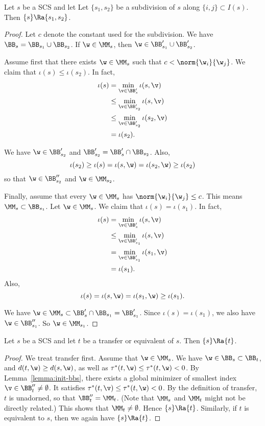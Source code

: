 \begin{lemma}[subdivision]
Let $s$ be a SCS and let
Let $\{s_1,s_2\}$ be a subdivision of $s$ along $\{i,j\}\subset I(s)$.
Then $\{s\}\Ra\{s_1,s_2\}$.
\end{lemma}

\begin{proof}
Let $c$ denote the constant used for the subdivision.
We have $\BB_s =
\BB_{s_1}\cup \BB_{s_2}$.  If $\w\in \MM_s$, then
$\w\in \BB'_{s_1}\cup\BB'_{s_2}$.

Assume first that there exists $\w\in \MM_s$ such that $c < \norm{\w_i}{\w_j}$.
We claim that $\iota(s) \le \iota(s_2)$.  In fact,
\begin{align*}
\iota(s) &=\min_{\v\in \BB'_s} \iota(s,\v)\\
&\le \min_{\v\in \BB'_{s_2}} \iota(s,\v) \\
&\le \min_{\v\in \BB'_{s_2}} \iota(s_2,\v) \\
&=\iota(s_2).
\end{align*}

We have $\w\in\BB'_{s_2}$ and $\BB'_{s_2} = \BB'_s \cap \BB_{s_2}$.
Also,
\[
\iota(s_2)\ge \iota(s) = \iota(s,\w) = \iota(s_2,\w) \ge \iota(s_2)
\]
so that $\w\in \BB''_{s_2}$ and $\w\in \MM_{s_2}$.

Finally, assume that every $\w\in\MM_s$ has $\norm{\w_i}{\w_j}\le c$.  This
means $\MM_s\subset \BB_{s_1}$. Let $\w\in\MM_s$.
We claim that $\iota(s) = \iota(s_1)$.  In fact,
\begin{align*}
\iota(s) &= \min_{\v\in \BB'_s} \iota(s,\v) \\
   &\le \min_{\v\in\BB'_{s_1}}\iota(s,\v)\\
   &=\min_{\v\in \BB'_{s_1}}\iota(s_1,\v)\\
   &=\iota(s_1).
\end{align*}
Also, 
\[
\iota(s) = \iota(s,\w) = \iota(s_1,\w) \ge \iota(s_1).
\]

We have $\w\in\MM_s\subset \BB'_s\cap \BB_{s_1} = \BB'_{s_1}$.
Since $\iota(s)=\iota(s_1)$, we also have $\w\in \BB''_{s_1}$.
So $\w\in \MM_{s_1}$.
\end{proof}

\begin{lemma}  
Let $s$ be a SCS and let
 $t$ be a transfer or equivalent of $s$.  
Then  $\{s\}\Ra\{t\}$.
\end{lemma}

\begin{proof}
We treat transfer first.
Assume that $\w\in \MM_s$.
We have $\w\in \BB_s\subset\BB_t$, and $d(t,\w) \ge d(s,\w)$,
as well as $\tau^*(t,\w)\le\tau^*(t,\w)< 0$.   By Lemma~\ref{lemma:init-bbs}, there
exists a global minimizer of smallest index
$\v\in\BB''_t\ne\emptyset$.  It satisfies
$\tau^*(t,\v)\le\tau^*(t,\w)< 0$.  By the definition of transfer,
$t$
is unadorned, so that $\BB''_t=\MM_t$.  (Note that $\MM_s$ and
$\MM_t$
might not be directly related.)  This shows that
$\MM_t\ne\emptyset$.
Hence $\{s\}\Ra\{t\}$.  Similarly, if $t$ is equivalent to $s$,
then we again have $\{s\}\Ra\{t\}$.
\end{proof}


